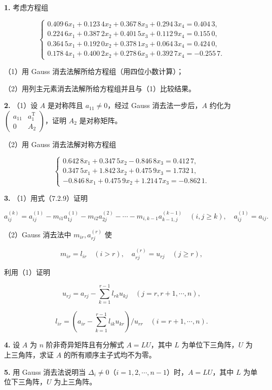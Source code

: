 \documentclass[
  10pt,
  fontset=fandol]{ctexart}
\begin{document}
\textbf{1.} 考虑方程组

\[
\begin{cases}
0.409\,6x_1+0.123\,4x_2+0.367\,8x_3+0.294\,3x_4=0.404\,3,\\
0.224\,6x_1+0.387\,2x_2+0.401\,5x_3+0.112\,9x_4=0.155\,0,\\
0.364\,5x_1+0.192\,0x_2+0.378\,1x_3+0.064\,3x_4=0.424\,0,\\
0.178\,4x_1+0.400\,2x_2+0.278\,6x_3+0.392\,7x_4=-0.255\,7.
\end{cases}
\]

（1）用 Gauss 消去法解所给方程组（用四位小数计算）；

（2）用列主元素消去法解所给方程组并且与（1）比较结果。

\textbf{2.} （1）设 \(A\) 是对称阵且 \(a_{11}\neq0\)，经过 Gauss
消去法一步后，\(A\) 约化为
\(\begin{pmatrix}a_{11}&a_1^{\mathrm T}\\0&A_2\end{pmatrix}\)，证明
\(A_2\) 是对称矩阵。

（2）用 Gauss 消去法解对称方程组

\[
\begin{cases}
0.642\,8x_1+0.347\,5x_2-0.846\,8x_3=0.412\,7,\\
0.347\,5x_1+1.842\,3x_2+0.475\,9x_3=1.732\,1,\\
-0.846\,8x_1+0.475\,9x_2+1.214\,7x_3=-0.862\,1.
\end{cases}
\]

\textbf{3.} （1）用式（7.2.9）证明

\[
a_{ij}^{(k)}=a_{ij}^{(1)}-m_{i1}a_{1j}^{(1)}-m_{i2}a_{2j}^{(2)}-\cdots-m_{i,k-1}a_{k-1,j}^{(k-1)}
\quad(i,j\geqslant k),\quad a_{ij}^{(1)}=a_{ij}.
\]

（2）Gauss 消去法中 \(m_{ir},a_{rj}^{(r)}\) 使

\[
m_{ir}=l_{ir}\quad(i>r),\quad a_{rj}^{(r)}=u_{rj}\quad(j\geqslant r),
\]

利用（1）证明

\[
u_{rj}=a_{rj}-\sum_{k=1}^{r-1}l_{rk}u_{kj}\quad(j=r,r+1,\cdots,n),
\]

\[
l_{ir}=\left(a_{ir}-\sum_{k=1}^{r-1}l_{ik}u_{kr}\right)/u_{rr}\quad(i=r+1,\cdots,n).
\]

\textbf{4.} 设 \(A\) 为 \(n\) 阶非奇异矩阵且有分解式 \(A=LU\)，其中
\(L\) 为单位下三角阵，\(U\) 为上三角阵，求证 \(A\)
的所有顺序主子式均不为零。

\textbf{5.} 用 Gauss 消去法说明当
\(\Delta_i\neq0\)（\(i=1,2,\cdots,n-1\)）时，\(A=LU\)，其中 \(L\)
为单位下三角阵，\(U\) 为上三角阵。
\end{document}
